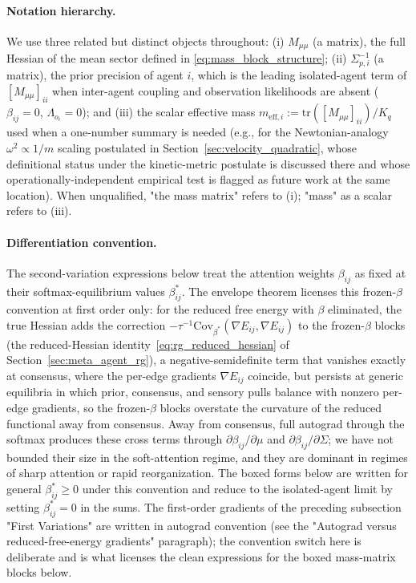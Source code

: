 \documentclass[11pt]{article}
\begin{document}
\paragraph{Notation hierarchy.}
We use three related but distinct objects throughout: (i) $M_{\mu\mu}$ (a matrix), the full Hessian of the mean sector defined in \eqref{eq:mass_block_structure}; (ii) $\Sigma_{p,i}^{-1}$ (a matrix), the prior precision of agent $i$, which is the leading isolated-agent term of $[M_{\mu\mu}]_{ii}$ when inter-agent coupling and observation likelihoods are absent ($\beta_{ij}=0$, $\Lambda_{o_i}=0$); and (iii) the scalar effective mass $m_{\text{eff},i} := \mathrm{tr}([M_{\mu\mu}]_{ii})/K_q$ used when a one-number summary is needed (e.g., for the Newtonian-analogy $\omega^2 \propto 1/m$ scaling postulated in Section~\ref{sec:velocity_quadratic}, whose definitional status under the kinetic-metric postulate is discussed there and whose operationally-independent empirical test is flagged as future work at the same location). When unqualified, "the mass matrix" refers to (i); "mass" as a scalar refers to (iii).

\paragraph{Differentiation convention.}
The second-variation expressions below treat the attention weights $\beta_{ij}$ as fixed at their softmax-equilibrium values $\beta_{ij}^*$. The envelope theorem licenses this frozen-$\beta$ convention at first order only: for the reduced free energy with $\beta$ eliminated, the true Hessian adds the correction $-\tau^{-1}\mathrm{Cov}_{\beta^*}(\nabla E_{ij}, \nabla E_{ij})$ to the frozen-$\beta$ blocks (the reduced-Hessian identity~\eqref{eq:rg_reduced_hessian} of Section~\ref{sec:meta_agent_rg}), a negative-semidefinite term that vanishes exactly at consensus, where the per-edge gradients $\nabla E_{ij}$ coincide, but persists at generic equilibria in which prior, consensus, and sensory pulls balance with nonzero per-edge gradients, so the frozen-$\beta$ blocks overstate the curvature of the reduced functional away from consensus. Away from consensus, full autograd through the softmax produces these cross terms through $\partial \beta_{ij}/\partial \mu$ and $\partial \beta_{ij}/\partial \Sigma$; we have not bounded their size in the soft-attention regime, and they are dominant in regimes of sharp attention or rapid reorganization. The boxed forms below are written for general $\beta_{ij}^* \geq 0$ under this convention and reduce to the isolated-agent limit by setting $\beta_{ij}^* = 0$ in the sums. The first-order gradients of the preceding subsection "First Variations" are written in autograd convention (see the "Autograd versus reduced-free-energy gradients" paragraph); the convention switch here is deliberate and is what licenses the clean expressions for the boxed mass-matrix blocks below.
\end{document}
